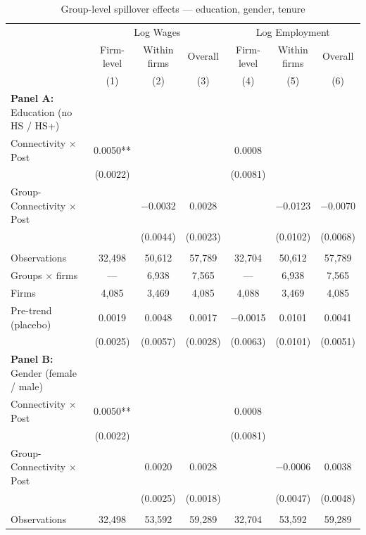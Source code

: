 \begin{table}[H]
\centering
\caption{Group-level spillover effects --- education, gender, tenure}
\scriptsize
\begin{tabular}{lcccccc}
\toprule\toprule
 & \multicolumn{3}{c}{Log Wages} & \multicolumn{3}{c}{Log Employment} \\
\cmidrule(lr){2-4} \cmidrule(lr){5-7}
 & \shortstack{Firm-\\level} & \shortstack{Within\\firms} & Overall
 & \shortstack{Firm-\\level} & \shortstack{Within\\firms} & Overall \\
 & (1) & (2) & (3) & (4) & (5) & (6) \\
\midrule
\textbf{Panel A:} Education (no HS / HS+) &  &  &  &  &  &  \\
Connectivity $\times$ Post & 0.0050** &  &  & 0.0008 &  &  \\
 & (0.0022) &  &  & (0.0081) &  &  \\
Group-Connectivity $\times$ Post &  & $-$0.0032 & 0.0028 &  & $-$0.0123 & $-$0.0070 \\
 &  & (0.0044) & (0.0023) &  & (0.0102) & (0.0068) \\
 &  &  &  &  &  &  \\
Observations & 32{,}498 & 50{,}612 & 57{,}789 & 32{,}704 & 50{,}612 & 57{,}789 \\
Groups $\times$ firms & --- & 6{,}938 & 7{,}565 & --- & 6{,}938 & 7{,}565 \\
Firms & 4{,}085 & 3{,}469 & 4{,}085 & 4{,}088 & 3{,}469 & 4{,}085 \\
Pre-trend (placebo) & 0.0019 & 0.0048 & 0.0017 & $-$0.0015 & 0.0101 & 0.0041 \\
 & (0.0025) & (0.0057) & (0.0028) & (0.0063) & (0.0101) & (0.0051) \\
\midrule
\textbf{Panel B:} Gender (female / male) &  &  &  &  &  &  \\
Connectivity $\times$ Post & 0.0050** &  &  & 0.0008 &  &  \\
 & (0.0022) &  &  & (0.0081) &  &  \\
Group-Connectivity $\times$ Post &  & 0.0020 & 0.0028 &  & $-$0.0006 & 0.0038 \\
 &  & (0.0025) & (0.0018) &  & (0.0047) & (0.0048) \\
 &  &  &  &  &  &  \\
Observations & 32{,}498 & 53{,}592 & 59{,}289 & 32{,}704 & 53{,}592 & 59{,}289 \\

\end{tabular}
\end{table}
